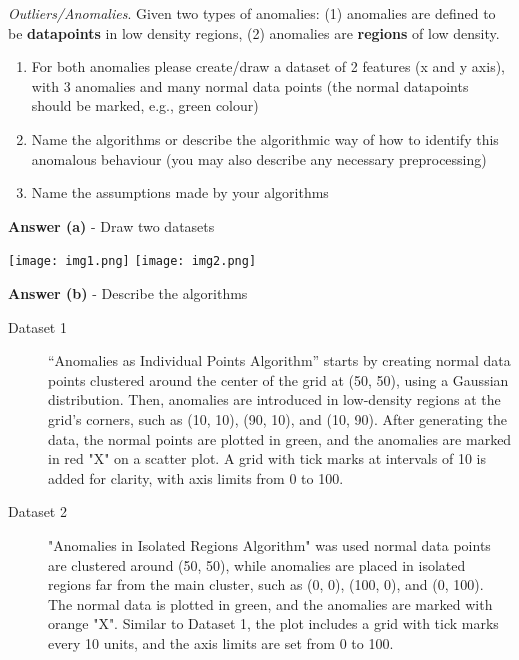 \documentclass[a4paper,10pt]{article}\setlength{\textheight}{10in}\setlength{\textwidth}{6.5in}\setlength{\topmargin}{-0.125in}\setlength{\oddsidemargin}{-.2in}\setlength{\evensidemargin}{-.2in}\setlength{\headsep}{0.2in}\setlength{\footskip}{0pt}\usepackage{amsmath}\usepackage{fancyhdr}\usepackage{enumitem}\usepackage{hyperref}\usepackage{xcolor}\usepackage{graphicx}\usepackage[export]{adjustbox}\usepackage{caption}\usepackage{float}\usepackage{booktabs}\usepackage{makecell}\pagestyle{fancy}
\begin{document}
\begin{enumerate}[topsep=0mm, partopsep=0mm, leftmargin=*]
\begin{itemize}
    \end{itemize}


{\color{blue}
\clearpage\item \textit{Outliers/Anomalies}. Given two types of anomalies: (1) anomalies are defined to be \textbf{datapoints} in low density regions, (2) anomalies are \textbf{regions} of low density.
\begin{enumerate}
\item For both anomalies please create/draw a dataset of 2 features (x and y axis), with 3 anomalies and many normal data points (the normal datapoints should be marked, e.g., green colour)
\item Name the algorithms or describe the algorithmic way of how to identify this anomalous behaviour (you may also describe any necessary preprocessing)
\item Name the assumptions made by your algorithms
\end{enumerate}}




\textbf{Answer (a)} - Draw two datasets %
    \begin{center}
    \texttt{[image: img1.png]}
        \hspace{2cm}
    \texttt{[image: img2.png]}
    \end{center}


\textbf{Answer (b)} - Describe the algorithms 
\begin{description}
	\item[Dataset 1] ``Anomalies as Individual Points Algorithm'' starts by creating normal data points clustered around the center of the grid at (50, 50), using a Gaussian distribution. Then, anomalies are introduced in low-density regions at the grid's corners, such as (10, 10), (90, 10), and (10, 90). After generating the data, the normal points are plotted in green, and the anomalies are marked in red "X" on a scatter plot. A grid with tick marks at intervals of 10 is added for clarity, with axis limits from 0 to 100.
	\item[Dataset 2] "Anomalies in Isolated Regions Algorithm" was used normal data points are clustered around (50, 50), while anomalies are placed in isolated regions far from the main cluster, such as (0, 0), (100, 0), and (0, 100). The normal data is plotted in green, and the anomalies are marked with orange "X". Similar to Dataset 1, the plot includes a grid with tick marks every 10 units, and the axis limits are set from 0 to 100.
\end{description}



\end{enumerate}
\end{document}
